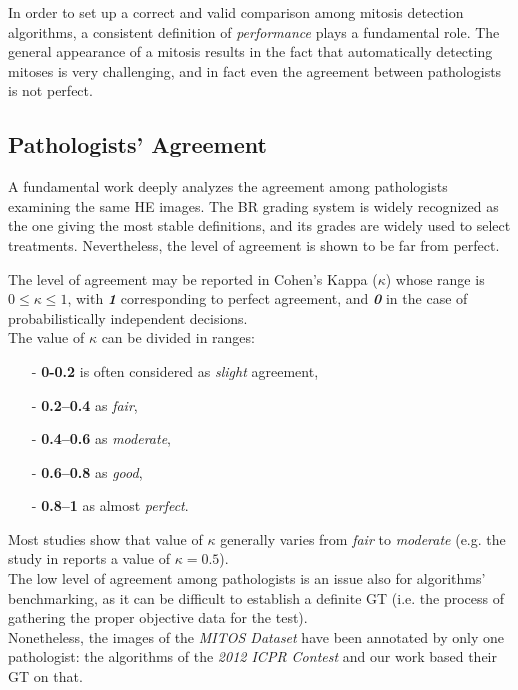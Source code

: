 In order to set up a correct and valid comparison among mitosis detection algorithms, a consistent definition of \textit{performance} plays a fundamental role.
The general appearance of a mitosis results in the fact that automatically detecting mitoses is very challenging, and in fact even the agreement between pathologists is not perfect.

\vspace{0.5cm}

\subsection{Pathologists' Agreement}
\label{ch3:humans}

A fundamental work \cite{mitoticRecognition03Agreement} deeply analyzes the agreement among pathologists examining the same \Gls{HE} images. The \Gls{BR} grading system is widely
recognized as the one giving the most stable definitions, and its grades are widely used to select treatments. Nevertheless, the level of agreement is shown to be far from perfect.

The level of agreement may be reported in Cohen's Kappa ($\kappa$) \cite{cohen1960coefficient} whose range is $0 \leq \kappa \leq 1$, with
\textit{\textbf{1}} corresponding to perfect agreement, and \textit{\textbf{0}} in the case of probabilistically independent decisions.\\

The value of $\kappa$ can be divided in ranges:

\begin{itemize}
 \item [-] \textbf{0-0.2} is often considered as \textit{slight} agreement,
 \item [-] \textbf{0.2–0.4} as \textit{fair},
 \item [-] \textbf{0.4–0.6} as \textit{moderate},
 \item [-] \textbf{0.6–0.8} as \textit{good},
 \item [-] \textbf{0.8–1} as almost \textit{perfect}.
\end{itemize}

Most studies show that value of $\kappa$ generally varies from \textit{fair} to \textit{moderate} (e.g. the study in \cite{meyer2005breast} reports a value of $\kappa = 0.5$).\\
The low level of agreement among pathologists is an issue also for algorithms' benchmarking, as it can be difficult to establish a definite \Gls{GT} (i.e. the process of gathering the proper objective data for the test).\\
Nonetheless, the images of the \textit{MITOS Dataset} have been annotated by only one pathologist: the algorithms of the \textit{2012 ICPR Contest} and our work based their \Gls{GT} on that.

